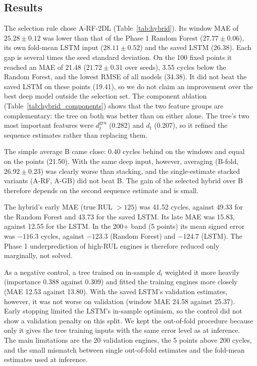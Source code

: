 \subsection{Results}
The selection rule chose A-RF-2DL (Table~\ref{tab:hybrid}). Its window MAE of $25.28\pm0.12$ was lower than that of the Phase 1 Random Forest ($27.77\pm0.06$), its own fold-mean LSTM input ($28.11\pm0.52$) and the saved LSTM (26.38). Each gap is several times the seed standard deviation. On the 100 fixed points it reached an MAE of 21.48 ($21.72\pm0.31$ over seeds), 3.55 cycles below the Random Forest, and the lowest RMSE of all models (34.38). It did not beat the saved LSTM on these points (19.41), so we do not claim an improvement over the best deep model outside the selection set. The component ablation (Table~\ref{tab:hybrid_components}) shows that the two feature groups are complementary: the tree on both was better than on either alone. The tree's two most important features were $d^{\mathrm{gru}}_t$ (0.282) and $d_t$ (0.207), so it refined the sequence estimates rather than replacing them.

The simple average B came close: 0.40 cycles behind on the windows and equal on the points (21.50). With the same deep input, however, averaging (B-fold, $26.92\pm0.23$) was clearly worse than stacking, and the single-estimate stacked variants (A-RF, A-GB) did not beat B. The gain of the selected hybrid over B therefore depends on the second sequence estimate and is small.

The hybrid's early MAE (true RUL $>125$) was 41.52 cycles, against 49.33 for the Random Forest and 43.73 for the saved LSTM. Its late MAE was 15.83, against 12.55 for the LSTM. In the 200+ band (5 points) its mean signed error was $-116.3$ cycles, against $-123.3$ (Random Forest) and $-124.7$ (LSTM). The Phase 1 underprediction of high-RUL engines is therefore reduced only marginally, not solved.

As a negative control, a tree trained on in-sample $d_t$ weighted it more heavily (importance 0.388 against 0.309) and fitted the training engines more closely (MAE 12.53 against 13.80). With the saved LSTM's validation estimates, however, it was not worse on validation (window MAE 24.58 against 25.37). Early stopping limited the LSTM's in-sample optimism, so the control did not show a validation penalty on this split. We kept the out-of-fold procedure because only it gives the tree training inputs with the same error level as at inference. The main limitations are the 20 validation engines, the 5 points above 200 cycles, and the small mismatch between single out-of-fold estimates and the fold-mean estimates used at inference.
